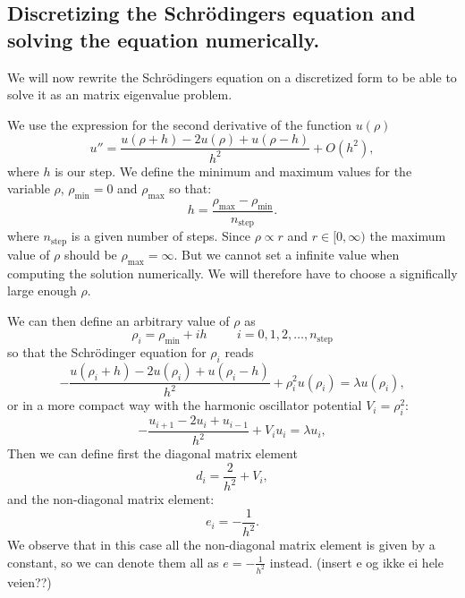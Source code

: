 \documentclass[11pt,a4wide]{article}
\begin{document}
\subsection{Discretizing the Schr\"odingers equation and solving the equation numerically.} \label{sec: descrete}
We will now rewrite the Schr\"odingers equation on a discretized form to be able to solve it as an matrix eigenvalue problem.

We use the expression for the second derivative of the function $u(\rho)$
\begin{equation}
    u''=\frac{u(\rho+h) -2u(\rho) +u(\rho-h)}{h^2} +O(h^2),
    \label{eq:diffoperation}
\end{equation} 
where $h$ is our step. We define the minimum and maximum values for the variable $\rho$,
$\rho_{\mathrm{min}}=0$  and $\rho_{\mathrm{max}}$ so that:
\[
  h=\frac{\rho_{\mathrm{max}}-\rho_{\mathrm{min}} }{n_{\mathrm{step}}}.
\]
where $n_{\mathrm{step}}$ is a given number of steps. Since $\rho \propto r$ and $r\in [0,\infty)$ the maximum value of $\rho$ should be $\rho_{\mathrm{max}}=\infty$. But we cannot set a infinite value when computing the solution numerically. We will therefore have to choose a significally large enough $\rho$.

We can then define an arbitrary value of $\rho$ as 
\[
    \rho_i= \rho_{\mathrm{min}} + ih \hspace{1cm} i=0,1,2,\dots , n_{\mathrm{step}}
\]
so that the Schr\"odinger equation for $\rho_i$ reads
\[
-\frac{u(\rho_i+h) -2u(\rho_i) +u(\rho_i-h)}{h^2}+\rho_i^2u(\rho_i)  = \lambda u(\rho_i),
\]
or in a more compact way with the harmonic oscillator potential $V_i=\rho_i^2$:
\begin{equation}
-\frac{u_{i+1} -2u_i +u_{i-1} }{h^2}+V_iu_i  = \lambda u_i,
\label{eq: sch_discrete_first}
\end{equation}
Then we can define first the diagonal matrix element
\[
   d_i=\frac{2}{h^2}+V_i,
\]
and the non-diagonal matrix element:
\[
   e_i=-\frac{1}{h^2}.
\]
We observe that in this case all the non-diagonal matrix element is given by a constant, so we can denote them all as $e=-\frac{1}{h^2}$ instead. (insert e og ikke ei hele veien??)
 
\end{document}
